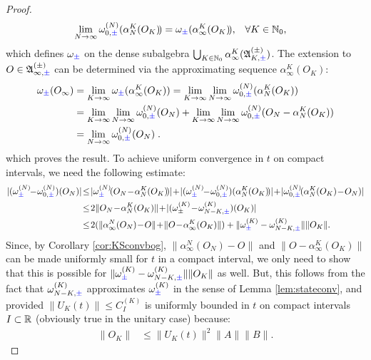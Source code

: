 \documentclass[a4paper, 11pt]{article}
\newcommand{\fA}{\mathfrak{A}}\newcommand{\cA}{\mathcal{A}}\newcommand{\dA}{\mathds{A}}\newcommand{\sA}{\mathscr{A}}
\DeclareMathOperator{\1}{\mathds{1}}
\begin{document}
\begin{proof}
\begin{align*}
\lim_{N\rightarrow\infty}\omega^{(N)}_{0,{\color{blue}\pm}}(\alpha^{K}_{N}(O_{K})\!) & = \omega_{{\color{blue}\pm}}(\alpha^{K}_{\infty}(O_{K})\!), & \forall K&\in\mathbb{N}_{0},
\end{align*}
which defines $\omega_{{\color{blue}\pm}}$ on the dense subalgebra $\bigcup_{K\in\N_{0}}\alpha^{K}_{\infty}(\fA^{(\pm)}_{K,{\color{blue}\pm}})$. The extension to $O\in\fA^{(\pm)}_{\infty,{\color{blue}\pm}}$ can be determined via the approximating sequence $\alpha^{K}_{\infty}(O_{K})$:
\begin{align*}
\omega_{{\color{blue}\pm}}(O_{\infty}) & = \lim_{K\rightarrow\infty}\omega_{{\color{blue}\pm}}(\alpha^{K}_{\infty}(O_{K})) = \lim_{K\rightarrow\infty}\lim_{N\rightarrow\infty}\omega^{(N)}_{0,{\color{blue}\pm}}(\alpha^{K}_{N}(O_{K})) \\
& = \lim_{K\rightarrow\infty}\lim_{N\rightarrow\infty}\omega^{(N)}_{0,{\color{blue}\pm}}(O_{N}) + \lim_{K\rightarrow\infty}\lim_{N\rightarrow\infty}\omega^{(N)}_{0,{\color{blue}\pm}}(O_{N}-\alpha^{K}_{N}(O_{K})) \\
& = \lim_{N\rightarrow\infty}\omega^{(N)}_{0,{\color{blue}\pm}}(O_{N})\;.
\end{align*}
which proves the result. To achieve uniform convergence in $t$ on compact intervals, we need the following estimate:
\begin{align*}
|(\omega^{(N)}_{{\color{blue}\pm}}\!\!-\!\omega^{(N)}_{0,{\color{blue}\pm}})(O_{N})| & \!\leq\!|\omega^{(N)}_{{\color{blue}\pm}}\!(O_{N}\!-\!\alpha^{K}_{N}(O_{K})\!)|\!+\!|(\omega^{(N)}_{{\color{blue}\pm}}\!\!-\!\omega^{(N)}_{0,{\color{blue}\pm}})(\alpha^{K}_{N}(O_{K})\!)|\!+\!|\omega^{(N)}_{0,{\color{blue}\pm}}\!(\alpha^{K}_{N}(O_{K})\!-\!O_{N})| \\ 
 & \!\leq\! 2\|O_{N}\!-\!\alpha^{K}_{N}(O_{K})\|\!+\!|(\omega^{(K)}_{\pm}\!-\!\omega^{(K)}_{N-K,{\color{blue}\pm}})(O_{K})| \\
 & \!\leq\! 2(\|\alpha^{N}_{\infty}(O_{N})\!-\!O\|\!+\!\|O\!-\!\alpha^{K}_{\infty}(O_{K})\|)+\|\omega^{(K)}_{{\color{blue}\pm}}-\omega^{(K)}_{N-K,{\color{blue}\pm}}\|\|O_{K}\|.
\end{align*}
Since, by Corollary \ref{cor:KSconvbog}, $\|\alpha^{N}_{\infty}(O_{N})-O\|$ and $\|O-\alpha^{K}_{\infty}(O_{K})\|$ can be made uniformly small for $t$ in a compact interval, we only need to show that this is possible for $\|\omega^{(K)}_{{\color{blue}\pm}}-\omega^{(K)}_{N-K,{\color{blue}\pm}}\|\|O_{K}\|$ as well. But, this follows from the fact that $\omega^{(K)}_{N-K,{\color{blue}\pm}}$ approximates $\omega^{(K)}_{{\color{blue}\pm}}$ in the sense of Lemma \ref{lem:stateconv}, and provided $\|U_{K}(t)\|\leq C^{(K)}_{I}$ is uniformly bounded in $t$ on compact intervals $I\subset\mathbb{R}$ (obviously true in the unitary case) because:
\begin{align*}
\|O_{K}\| & \leq \|U_{K}(t)\|^{2}\|A\|\|B\|.
\end{align*}
\end{proof}
\end{document}

